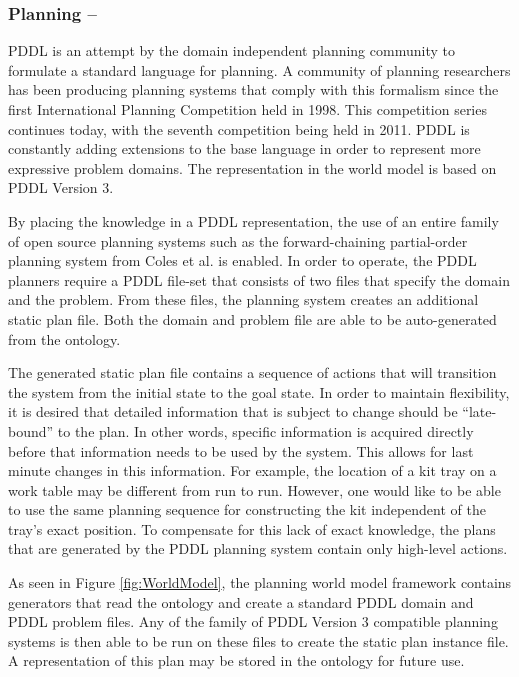\subsubsection{Planning --}
PDDL  is an attempt by the domain independent planning community to formulate a standard language for planning. A community of planning researchers has been producing planning systems that comply with this formalism since the first International Planning Competition held in 1998. This competition series
continues today, with the seventh competition being held in 2011. PDDL is constantly adding extensions to the base language in order to represent more expressive problem domains. The representation in the world model is based on PDDL Version 3.

By placing the knowledge in a PDDL representation, the use of an entire family of open source planning systems such as the forward-chaining partial-order planning system from Coles et al. \cite{Coles.ICAPS.2010}
is enabled. In order to operate, the PDDL planners require a PDDL file-set that consists of two files that specify the domain and the problem.
From these files, the planning system creates an additional static plan file. Both the domain and problem file are able to be auto-generated from the ontology.

The generated static plan file contains a sequence of actions that will transition the system from the initial state to the goal state. In order to maintain flexibility, it is desired that detailed information that is subject to change should be ``late-bound'' to the plan. In other words, specific information is acquired directly before that information needs to be used by the system. This allows for last minute changes in this information. For example, the location of a kit tray on a work table may be different from run to run. However, one would like to be able to use the same planning sequence for constructing the kit independent of the tray's exact position.
To compensate for this lack of exact knowledge, the plans that are generated by the PDDL planning system contain only high-level actions.

As seen in Figure \ref{fig:WorldModel}, the planning world model framework contains generators that read the ontology and create
a standard PDDL domain and PDDL problem files. Any of the family of PDDL Version 3 compatible planning systems is then able to be
run on these files to create the static plan instance file. A representation of this plan may be stored in the ontology for future use.
%
